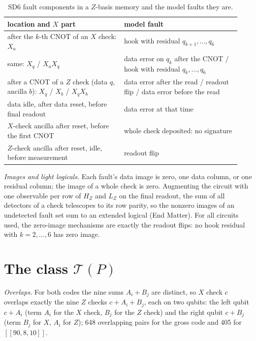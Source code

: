 \documentclass[aps,prl,twocolumn,superscriptaddress,nofootinbib]{revtex4-2}
\newcommand{\code}[1]{[[#1]]}
\newcommand{\T}{\mathcal{T}}
\begin{document}
\begin{table}[h]
\caption{SD6 fault components in a $Z$-basis memory and the model faults they are.}
\label{tab:model}
\begin{ruledtabular}
\begin{tabular}{p{0.47\linewidth}p{0.47\linewidth}}
location and $X$ part & model fault\\
\hline
after the $k$-th CNOT of an $X$ check: $X_a$ & hook with residual $q_{k+1},\dots,q_6$\\
same: $X_q$ / $X_aX_q$ & data error on $q_k$ after the CNOT / hook with residual $q_k,\dots,q_6$\\
after a CNOT of a $Z$ check (data $q$, ancilla $b$): $X_q$ / $X_b$ / $X_qX_b$ & data error after the read / readout flip / data error before the read\\
data idle, after data reset, before final readout & data error at that time\\
$X$-check ancilla after reset, before the first CNOT & whole check deposited: no signature\\
$Z$-check ancilla after reset, idle, before measurement & readout flip\\
\end{tabular}
\end{ruledtabular}
\end{table}

\emph{Images and light logicals.} Each fault's data image is zero, one data column, or one
residual column; the image of a whole check is zero. Augmenting the circuit with one
observable per row of $H_Z$ and $L_Z$ on the final readout, the sum of all detectors of a
check telescopes to its row parity, so the nonzero images of an undetected fault set sum to
an extended logical (End Matter). For all circuits used, the zero-image mechanisms are
exactly the readout flips: no hook residual with $k=2,\dots,6$ has zero image.

\section{The class $\T(P)$}\label{sm:class}
\emph{Overlaps.} For both codes the nine sums $A_i+B_j$ are distinct, so $X$ check $c$
overlaps exactly the nine $Z$ checks $c+A_i+B_j$, each on two qubits: the left qubit
$c+A_i$ (term $A_i$ for the $X$ check, $B_j$ for the $Z$ check) and the right qubit $c+B_j$
(term $B_j$ for $X$, $A_i$ for $Z$); 648 overlapping pairs for the gross code and 405 for
$\code{90,8,10}$.
\end{document}
